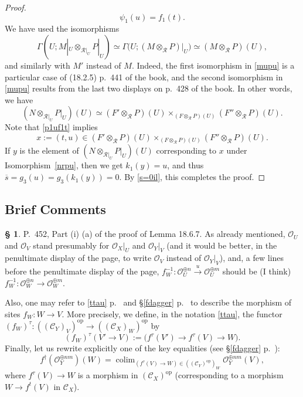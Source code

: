 \documentclass[12pt]{article}
\theoremstyle{remark}
\theoremstyle{definition}
\newtheorem{s}[thm]{\S}
\newcommand{\cc}{\mathcal}
\newcommand{\C}{\mathcal C}
\newcommand{\xr}{\xrightarrow}
\DeclareMathOperator*{\colim}{colim}
\DeclareMathOperator{\op}{op}
\begin{document}
\begin{proof}
%
\begin{equation}\label{p1uf1t}
\psi_1(u)=f_1(t).
\end{equation}
%
We have used the isomorphisms 
%
\begin{equation}\label{mupu}
\Gamma\left(U;M|_U\otimes_{\cc R|_U}P|_U\right)\simeq\Gamma\big(U;\left(M\otimes_{\cc R}P\right)|_U\big)\simeq\left(M\otimes_{\cc R}P\right)(U),
\end{equation}
% 
and similarly with $M'$ instead of $M$. Indeed, the first isomorphism in \eqref{mupu} is a particular case of (18.2.5) p.~441 of the book, and the second isomorphism in \eqref{mupu} results from the last two displays on p.~428 of the book. In other words, we have 
%
\begin{equation}\label{nrpu}
(N\otimes_{\cc R|_U}P|_U)(U)\simeq(F'\otimes_{\cc R}P)(U)\times_{(F\otimes_{\cc R}P)(U)}(F''\otimes_{\cc R}P)(U).
\end{equation}
% 
Note that \eqref{p1uf1t} implies 
$$
x:=(t,u)\in(F'\otimes_{\cc R}P)(U)\times_{(F\otimes_{\cc R}P)(U)}(F''\otimes_{\cc R}P)(U).
$$ 
If $y$ is the element of $(N\otimes_{\cc R|_U}P|_U)(U)$ corresponding to $x$ under Isomorphism~\eqref{nrpu}, then we get $k_1(y)=u$, and thus $\overline s=g_3(u)=g_3(k_1(y))=0$. By \eqref{s=0il}, this completes the proof. 
\end{proof}


\subsection{Brief Comments} 

\begin{s}
P.~452, Part (i) (a) of the proof of Lemma 18.6.7. As already mentioned, $\cc O_U$ and $\cc O_V$ stand presumably for $\cc O_X|_U$ and $\cc O_Y|_V$ (and it would be better, in the penultimate display of the page, to write $\cc O_V$ instead of $\cc O_Y|_V$), and, a few lines before the penultimate display of the page, $f_W^{-1}:\cc O_U^{\oplus n}\xr u\cc O_U^{\oplus m}$ should be (I think) $f_W^{-1}:\cc O_W^{\oplus n}\to\cc O_W^{\oplus m}$. 

Also, one may refer to \eqref{ttau} p.~\pageref{ttau} and \S\ref{fdagger} p.~\pageref{fdagger} to describe the morphism of sites $f_W:W\to V$. More precisely, we define, in the notation \eqref{ttau}, the functor $(f_W)^\tau:((\C_Y)_V)^{\op}\to((\C_X)_W)^{\op}$ by
$$
(f_W)^\tau(V'\to V):=\big(f^\tau(V')\to f^\tau(V)\to W\big).
$$
Finally, let us rewrite explicitly one of the key equalities (see \S\ref{fdagger} p.~\pageref{fdagger}): 
$$
f^\dagger(\cc O_Y^{\oplus nm})(W)=\colim_{(f^\tau(V)\to W)\in((\C_Y)^{\op})_W}\cc O_Y^{\oplus nm}(V),
$$ 
where $f^\tau(V)\to W$ is a morphism in $(\C_X)^{\op}$ (corresponding to a morphism $W\to f^t(V)$ in $\C_X$).
\end{s}
\printindex
\end{document}
